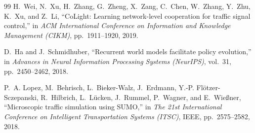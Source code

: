 \begin{small}
\begin{thebibliography}{99}
H.~Wei, N.~Xu, H.~Zhang, G.~Zheng, X.~Zang, C.~Chen, W.~Zhang, Y.~Zhu, K.~Xu, and Z.~Li, ``CoLight: Learning network-level cooperation for traffic signal control,'' in \emph{ACM International Conference on Information and Knowledge Management (CIKM)}, pp.~1911--1920, 2019.

D.~Ha and J.~Schmidhuber, ``Recurrent world models facilitate policy evolution,'' in \emph{Advances in Neural Information Processing Systems (NeurIPS)}, vol.~31, pp.~2450--2462, 2018.

P.~A. Lopez, M.~Behrisch, L.~Bieker-Walz, J.~Erdmann, Y.-P. Fl{\"o}tzer-Sczepanski, R.~Hilbrich, L.~L{\"u}cken, J.~Rummel, P.~Wagner, and E.~Wie{\ss}ner, ``Microscopic traffic simulation using SUMO,'' in \emph{The 21st International Conference on Intelligent Transportation Systems (ITSC)}, IEEE, pp.~2575--2582, 2018.

\end{thebibliography}
\end{small}
